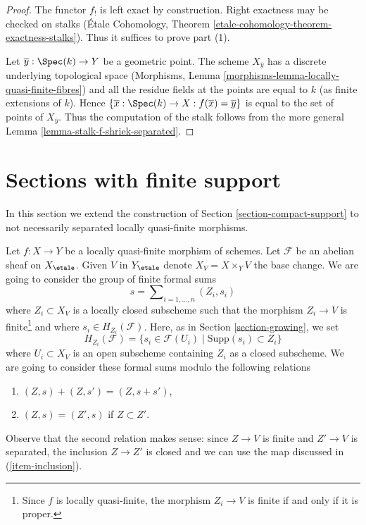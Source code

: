 \begin{proof}
The functor $f_!$ is left exact by construction. Right exactness may
be checked on stalks
(\'Etale Cohomology, Theorem \ref{etale-cohomology-theorem-exactness-stalks}).
Thus it suffices to prove part (1).

\medskip\noindent
Let $\overline{y} : \Spec(k) \to Y$ be a geometric point.
The scheme $X_{\overline{y}}$ has a discrete underlying
topological space
(Morphisms, Lemma \ref{morphisms-lemma-locally-quasi-finite-fibres})
and all the residue fields at the points are equal to $k$
(as finite extensions of $k$). Hence
$\{\overline{x} : \Spec(k) \to X : f(\overline{x}) = \overline{y}\}$
is equal to the set of points of $X_{\overline{y}}$.
Thus the computation of the stalk follows from the more general
Lemma \ref{lemma-stalk-f-shriek-separated}.
\end{proof}









\section{Sections with finite support}
\label{section-finite-support}

\noindent
In this section we extend the construction of
Section \ref{section-compact-support} to not necessarily
separated locally quasi-finite morphisms.

\medskip\noindent
Let $f : X \to Y$ be a locally quasi-finite morphism of schemes.
Let $\mathcal{F}$ be an abelian sheaf on $X_\etale$. Given $V$ in
$Y_\etale$ denote $X_V = X \times_Y V$ the base change. We are going
to consider the group of finite formal sums
\begin{equation}
\label{equation-formal-sum}
s = \sum\nolimits_{i = 1, \ldots, n} (Z_i, s_i)
\end{equation}
where $Z_i \subset X_V$ is a locally closed subscheme such that the
morphism $Z_i \to V$ is finite\footnote{Since $f$ is locally quasi-finite,
the morphism $Z_i \to V$ is finite if and only if it is proper.}
and where $s_i \in H_{Z_i}(\mathcal{F})$. Here, as in
Section \ref{section-growing}, we set
$$
H_{Z_i}(\mathcal{F}) =
\{s_i \in \mathcal{F}(U_i) \mid \text{Supp}(s_i) \subset Z_i\}
$$
where $U_i \subset X_V$ is an open subscheme containing $Z_i$ as a
closed subscheme. We are going to consider these formal sums modulo the
following relations
\begin{enumerate}
\item
\label{item-sum}
$(Z, s) + (Z, s') = (Z, s + s')$,
\item
\label{item-sub}
$(Z, s) = (Z', s)$ if $Z \subset Z'$.
\end{enumerate}
Observe that the second relation makes sense: since $Z \to V$ is finite
and $Z' \to V$ is separated, the inclusion $Z \to Z'$ is closed and we
can use the map discussed in (\ref{item-inclusion}).

